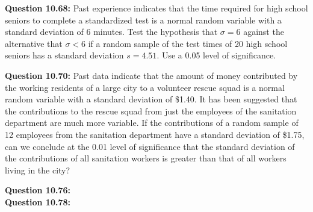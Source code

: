 \documentclass{article}
\begin{document}
\textbf{Question 10.68:}
Past experience indicates that the time required 
for high school seniors to complete a standardized 
test is a normal random variable with a standard
deviation of 6 minutes. Test the hypothesis that $\sigma = 6$
against the alternative that $\sigma < 6$ if a random sample of
the test times of 20 high school seniors has a standard
deviation $s = 4.51$. Use a 0.05 level of significance.
\newline

\textbf{Question 10.70:}
Past data indicate that the amount of money
contributed by the working residents of a large city to
a volunteer rescue squad is a normal random variable
with a standard deviation of \$1.40. It has been 
suggested that the contributions to the rescue squad from
just the employees of the sanitation department are
much more variable. If the contributions of a random
sample of 12 employees from the sanitation department
have a standard deviation of \$1.75, can we conclude at
the 0.01 level of significance that the standard 
deviation of the contributions of all sanitation workers is
greater than that of all workers living in the city?
\newline

\textbf{Question 10.76:}
\\

\textbf{Question 10.78:}
\end{document}
